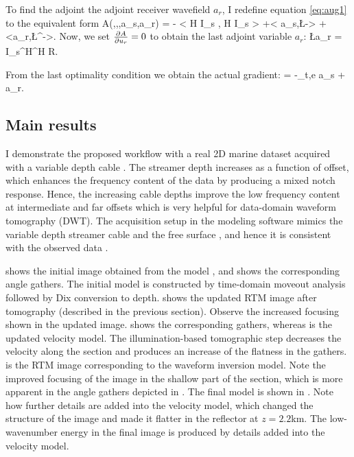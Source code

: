 To find the adjoint the adjoint receiver wavefield $a_r$, I redefine  equation \ref{eq:aug1}  to 
the equivalent form
\beq
    A(\m,\us,\ur,a_s,a_r) = - < H I_s \ur, H I_s \ur> +< a_s,\L\us-\fs> +<a_r,\L^\top\ur-\fr>.
\eeq
Now, we set $\frac{\partial A }{\partial {u_r}}=0$ to obtain the last adjoint variable $a_r$:
\beq
   \L a_r = I_s^\top H^\top H R.
\eeq

From the last optimality condition we obtain the actual gradient:
\beq
  =  -\sum_{t,e}  a_s + a_r.
\eeq

\subsection{Main results}
 I demonstrate the proposed workflow with a real 2D marine dataset
acquired with a variable depth cable  \citep{soubaras2010variable}.
The streamer depth increases as a function of offset, which enhances the frequency
content of the data by producing a mixed notch response. Hence,
the increasing cable depths improve the low frequency content at 
intermediate and far offsets which is very helpful for data-domain waveform tomography (DWT). The acquisition setup 
in the modeling software mimics the
variable depth streamer cable and the free surface \citep{hicks2002arbitrary}, and hence it is consistent with the observed data .
  
  shows the initial image obtained from the model , and  
shows the corresponding angle gathers. The initial model is constructed by time-domain moveout analysis followed
by Dix conversion to depth.  shows the updated RTM image
after tomography (described in the previous section). Observe the increased focusing shown in the updated image. 
  shows the corresponding gathers, whereas  is the updated velocity model. The
illumination-based tomographic step decreases the velocity along the section and produces an increase of the flatness
in the gathers.  is the RTM image corresponding to the waveform inversion model. Note the improved
focusing of the image in the shallow part of the section, which is more apparent in the angle gathers 
depicted in . The final model is shown in . Note how further details are 
added into the velocity model, which changed the structure of the image and made it flatter in the
reflector at $z=2.2$km. The low-wavenumber energy
in the final image is produced by details added into the velocity model. 

